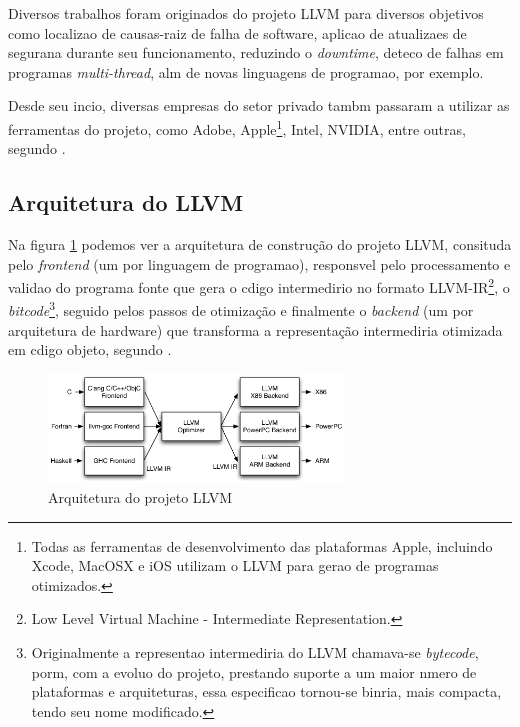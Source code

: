 Diversos trabalhos foram originados do projeto LLVM para diversos objetivos como localiza\ca o de causas-raiz de falha de software\cite{Sahoo13}, aplica\ca o de atualiza\co es de seguran\cc a durante seu funcionamento, reduzindo o \emph{downtime}\cite{Giuffrida13}, detec\ca o de falhas em programas \emph{multi-thread}\cite{Lucia13}, al\eh m de novas linguagens de programa\ca o, por exemplo.

Desde seu in\ih cio, diversas empresas do setor privado tamb\eh m passaram a utilizar as ferramentas do projeto, como Adobe, Apple\footnote{Todas as ferramentas de desenvolvimento das plataformas Apple, incluindo Xcode, MacOSX e iOS utilizam o LLVM para gera\ca o de programas otimizados.}, Intel, NVIDIA, entre outras, segundo \cite{LLVMorg}.

\subsection{Arquitetura do LLVM}

Na figura \ref{fig:llvmarch} podemos ver a arquitetura de construção do projeto LLVM, consitu\ih da pelo \emph{frontend} (um por linguagem de programa\ca o), respons\ah vel pelo processamento e valida\ca o do programa fonte que gera o c\oh digo intermedi\ah rio no formato LLVM-IR\footnote{Low Level Virtual Machine - Intermediate Representation.}, o \emph{bitcode}\footnote{Originalmente a representa\ca o intermedi\ah ria do LLVM chamava-se \emph{bytecode}, por\eh m, com a evolu\ca o do projeto, prestando suporte a um maior n\uh mero de plataformas e arquiteturas, essa especifica\ca o tornou-se bin\ah ria, mais compacta, tendo seu nome modificado.}, seguido pelos passos de otimização e finalmente o \emph{backend} (um por arquitetura de hardware) que transforma a representação intermedi\ah ria otimizada em c\oh digo objeto, segundo \cite{Dobbs12}.

\begin{figure}[htp]
  \begin{center}
    \includegraphics[width=0.7\textwidth]{figuras/llvmarch}
  \end{center}
  \caption{Arquitetura do projeto LLVM}
  \label{fig:llvmarch}
\end{figure}

